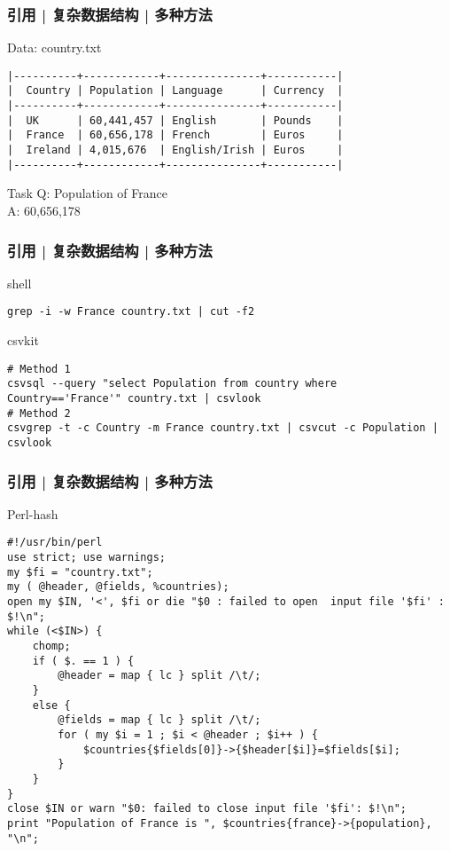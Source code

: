 \begin{frame}[fragile]
  \frametitle{引用 | 复杂数据结构 | 多种方法}
  \begin{block}{Data: country.txt}
  \vspace{-0.5em}
\begin{lstlisting}[basicstyle=\footnotesize\tt,numberstyle=\scriptsize]
|----------+------------+---------------+-----------|
|  Country | Population | Language      | Currency  |
|----------+------------+---------------+-----------|
|  UK      | 60,441,457 | English       | Pounds    |
|  France  | 60,656,178 | French        | Euros     |
|  Ireland | 4,015,676  | English/Irish | Euros     |
|----------+------------+---------------+-----------|
\end{lstlisting}
  \end{block}
  \pause
  \begin{block}{Task}
    Q: Population of France\\
    A: 60,656,178
  \end{block}
\end{frame}

\begin{frame}[fragile]
  \frametitle{引用 | 复杂数据结构 | 多种方法}
  \begin{block}{shell}
\begin{lstlisting}
grep -i -w France country.txt | cut -f2
\end{lstlisting}
  \end{block}
  \pause
  \begin{block}{csvkit}
\begin{lstlisting}
# Method 1
csvsql --query "select Population from country where Country=='France'" country.txt | csvlook
# Method 2
csvgrep -t -c Country -m France country.txt | csvcut -c Population | csvlook
\end{lstlisting}
  \end{block}
\end{frame}

\begin{frame}[fragile]
  \frametitle{引用 | 复杂数据结构 | 多种方法}
  \begin{block}{Perl-hash}
  \vspace{-0.6em}
\begin{lstlisting}[basicstyle=\scriptsize\tt,numberstyle=\scriptsize]
#!/usr/bin/perl
use strict; use warnings;
my $fi = "country.txt";
my ( @header, @fields, %countries);
open my $IN, '<', $fi or die "$0 : failed to open  input file '$fi' : $!\n";
while (<$IN>) {
    chomp;
    if ( $. == 1 ) {
        @header = map { lc } split /\t/;
    }
    else {
        @fields = map { lc } split /\t/;
        for ( my $i = 1 ; $i < @header ; $i++ ) {
            $countries{$fields[0]}->{$header[$i]}=$fields[$i];
        }
    }
}
close $IN or warn "$0: failed to close input file '$fi': $!\n";
print "Population of France is ", $countries{france}->{population}, "\n";
\end{lstlisting}
  \end{block}
\end{frame}

